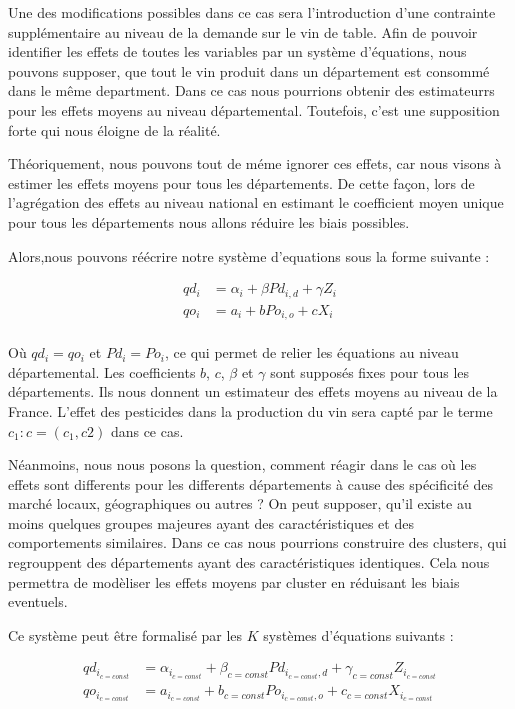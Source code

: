 \documentclass[11pt,]{article}
\begin{document}
Une des modifications possibles dans ce cas sera l'introduction d'une
contrainte supplémentaire au niveau de la demande sur le vin de table.
Afin de pouvoir identifier les effets de toutes les variables par un
système d'équations, nous pouvons supposer, que tout le vin produit dans
un département est consommé dans le même department. Dans ce cas nous
pourrions obtenir des estimateurrs pour les effets moyens au niveau
départemental. Toutefois, c'est une supposition forte qui nous éloigne
de la réalité.

Théoriquement, nous pouvons tout de méme ignorer ces effets, car nous
visons à estimer les effets moyens pour tous les départements. De cette
façon, lors de l'agrégation des effets au niveau national en estimant le
coefficient moyen unique pour tous les départements nous allons réduire
les biais possibles.

Alors,nous pouvons réécrire notre système d'equations sous la forme
suivante :

\begin{align*}
  qd_i & = \alpha_{i} + \beta Pd_{i,d} + \gamma Z_{i} \\
  qo_i & = a_i + b Po_{i,o} + c X_{i} \\ 
\end{align*}

Où \(qd_i = qo_i\) et \(Pd_i = Po_i\), ce qui permet de relier les
équations au niveau départemental. Les coefficients \(b\), \(c\),
\(\beta\) et \(\gamma\) sont supposés fixes pour tous les départements.
Ils nous donnent un estimateur des effets moyens au niveau de la France.
L'effet des pesticides dans la production du vin sera capté par le terme
\(c_{1} : c = (c_{1}, c{2})\) dans ce cas.

Néanmoins, nous nous posons la question, comment réagir dans le cas où
les effets sont differents pour les differents départements à cause des
spécificité des marché locaux, géographiques ou autres ? On peut
supposer, qu'il existe au moins quelques groupes majeures ayant des
caractéristiques et des comportements similaires. Dans ce cas nous
pourrions construire des clusters, qui regrouppent des départements
ayant des caractéristiques identiques. Cela nous permettra de modèliser
les effets moyens par cluster en réduisant les biais eventuels.

Ce système peut être formalisé par les \(K\) systèmes d'équations
suivants :

\begin{align*}
  qd_{i_{c = const}} & = \alpha_{i_{c = const}} + \beta_{c = const} Pd_{i_{c = const},d} + \gamma_{c = const} Z_{i_{c = const}} \\
  qo_{i_{c = const}} & = a_{i_{c = const}} + b_{c = const} Po_{i_{c = const},o} + c_{c = const} X_{i_{c = const}} \\ 
\end{align*}
\end{document}
